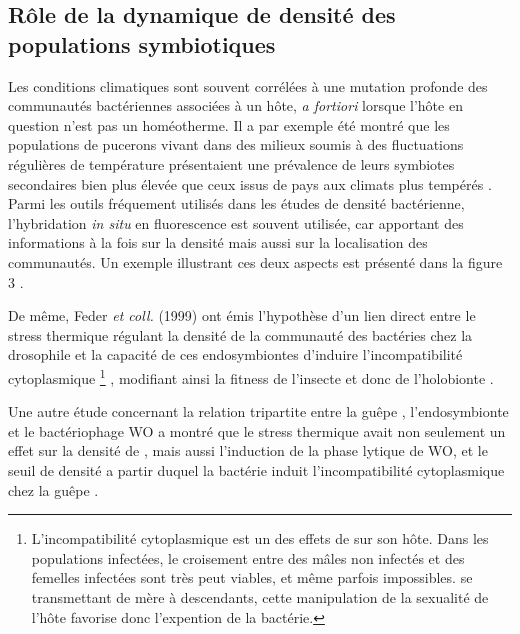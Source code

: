 \subsection{Rôle de la dynamique de densité des populations symbiotiques}

Les conditions climatiques sont souvent corrélées à une mutation profonde des communautés bactériennes associées à un hôte, \textit{a fortiori} lorsque l'hôte en question n'est pas un homéotherme.
Il a par exemple été montré que les populations de pucerons vivant dans des milieux soumis à des fluctuations régulières de température présentaient une prévalence de leurs symbiotes secondaires bien plus élevée que ceux issus de pays aux climats plus tempérés \cite{harmon2009}.
Parmi les outils fréquement utilisés dans les études de densité bactérienne, l'hybridation \textit{in situ} en fluorescence est souvent utilisée, car apportant des informations à la fois sur la densité mais aussi sur la localisation des communautés.
Un exemple illustrant ces deux aspects est présenté dans la figure 3 \cite{brumin2011}.

De même, Feder \textit{et coll.} (1999) ont émis l'hypothèse d'un lien direct entre le stress thermique régulant la densité de la communauté des bactéries  chez la drosophile et la capacité de ces endosymbiontes d'induire l'incompatibilité cytoplasmique%
\footnote{L'incompatibilité cytoplasmique est un des effets de  sur son hôte. Dans les populations infectées, le croisement entre des mâles non infectés et des femelles infectées sont très peut viables, et même parfois impossibles.  se transmettant de mère à descendants, cette manipulation de la sexualité de l'hôte favorise donc l'expention de la bactérie.}%
, modifiant ainsi la fitness de l'insecte et donc de l'holobionte \cite{feder1999}. 

Une autre étude concernant la relation tripartite entre la guêpe , l'endosymbionte  et le bactériophage WO a montré que le stress thermique avait non seulement un effet sur la densité de , mais aussi l'induction de la phase lytique de WO, et le seuil de densité a partir duquel la bactérie  induit l'incompatibilité cytoplasmique chez la guêpe \cite{bordenstein2011}.
